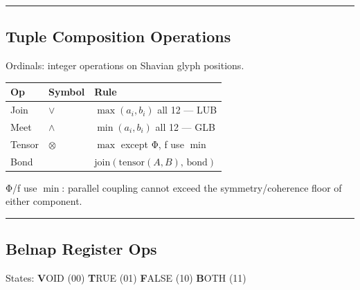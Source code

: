 \documentclass[12pt,a4paper]{article}
\newcommand{\heb}[1]{{\igprimfont #1}}
\begin{document}
\begin{center}\rule{0.5\linewidth}{0.5pt}\end{center}

\hypertarget{tuple-composition-operations}{%
\subsection{Tuple Composition
Operations}\label{tuple-composition-operations}}

Ordinals: integer operations on Shavian glyph positions.

\begin{longtable}[]{@{}lll@{}}
\toprule
Op & Symbol & Rule\tabularnewline
\midrule
\endhead
Join & \(\vee\) & \(\max(a_i, b_i)\) all 12 --- LUB\tabularnewline
Meet & \(\wedge\) & \(\min(a_i, b_i)\) all 12 --- GLB\tabularnewline
Tensor & \(\otimes\) & \(\max\) except \heb{Φ}, \heb{ƒ} use
\(\min\)\tabularnewline
Bond & &
\(\mathrm{join}(\mathrm{tensor}(A,B),\,\mathrm{bond})\)\tabularnewline
\bottomrule
\end{longtable}

\heb{Φ}/\heb{ƒ} use \(\min\): parallel coupling cannot exceed the
symmetry/coherence floor of either component.

\begin{center}\rule{0.5\linewidth}{0.5pt}\end{center}

\hypertarget{belnap-register-ops}{%
\subsection{Belnap Register Ops}\label{belnap-register-ops}}

States: \textbf{V}OID (00) \textbf{T}RUE (01) \textbf{F}ALSE (10)
\textbf{B}OTH (11)
\end{document}
